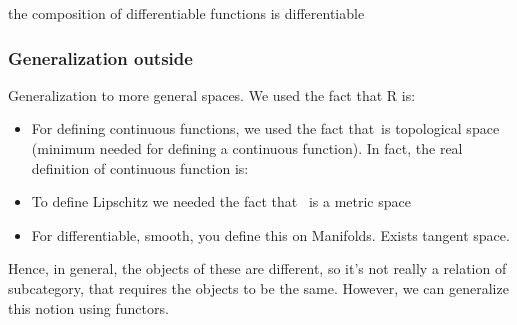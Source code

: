{    \begin{example}
        the composition of differentiable functions is differentiable
    \end{example}


    \subsubsection{Generalization outside \reals}
    Generalization to more general spaces.
    We used the fact that R is:
    \begin{itemize}
        \item For defining continuous functions, we used the fact that~\reals is topological space (minimum needed for defining a continuous function).
              In fact, the real definition of continuous function is:


        \item To define Lipschitz we needed the fact that~ \reals is a metric space
        \item For differentiable, smooth, you define this on Manifolds.
              Exists tangent space.
    \end{itemize}

    Hence, in general, the objects of these are different, so it's not really a relation of subcategory, that requires the objects to be the same.
    However, we can generalize this notion using functors.

}

